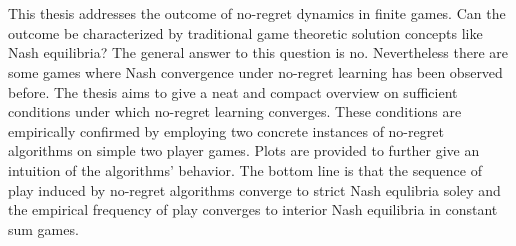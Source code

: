 \chapter{\abstractname}

This thesis addresses the outcome of no-regret dynamics in finite games. Can the outcome be characterized by traditional game theoretic solution concepts like Nash equilibria? The general answer to this question is no. Nevertheless there are some games where Nash convergence under no-regret learning has been observed before. The thesis aims to give a neat and compact overview on sufficient conditions under which no-regret learning converges. These conditions are empirically confirmed by employing two concrete instances of no-regret algorithms on simple two player games. Plots are provided to further give an intuition of the algorithms' behavior. The bottom line is that the sequence of play induced by no-regret algorithms converge to strict Nash equlibria soley and the empirical frequency of play converges to interior Nash equilibria in constant sum games.
